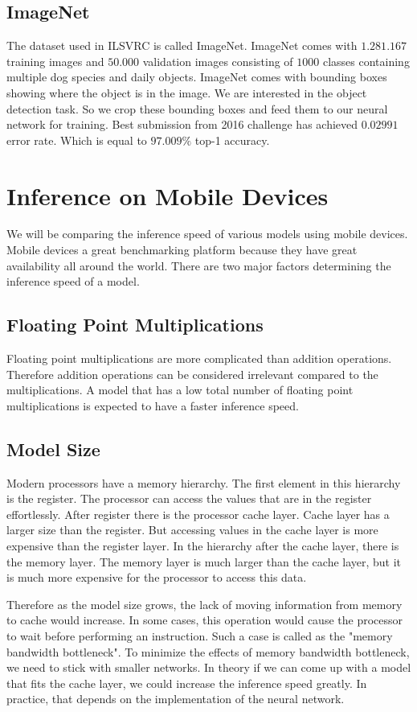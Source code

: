 \subsection{ImageNet}
The dataset used in ILSVRC is called ImageNet. ImageNet \cite{deng2012image} comes with $1.281.167$ training images and $50.000$ validation images consisting of $1000$ classes containing multiple dog species and daily objects. ImageNet comes with bounding boxes showing where the object is in the image. We are interested in the object detection task. So we crop these bounding boxes and feed them to our neural network for training. Best submission from 2016 challenge has achieved $0.02991$ error rate. Which is equal to $97.009\%$ top-1 accuracy. 
\iffalse
\section{Inference on Mobile Devices}
We will be comparing the inference speed of various models using mobile devices. Mobile devices a great benchmarking platform because they have great availability all around the world. There are two major factors determining the inference speed of a model.

\subsection{Floating Point Multiplications}
Floating point multiplications are more complicated than addition operations. Therefore addition operations can be considered irrelevant compared to the multiplications. A model that has a low total number of floating point multiplications is expected to have a faster inference speed.

\subsection{Model Size}
Modern processors have a memory hierarchy. The first element in this hierarchy is the register. The processor can access the values that are in the register effortlessly. After register there is the processor cache layer. Cache layer has a larger size than the register. But accessing values in the cache layer is more expensive than the register layer. In the hierarchy after the cache layer, there is the memory layer. The memory layer is much larger than the cache layer, but it is much more expensive for the processor to access this data. 

Therefore as the model size grows, the lack of moving information from memory to cache would increase. In some cases, this operation would cause the processor to wait before performing an instruction. Such a case is called as the "memory bandwidth bottleneck". To minimize the effects of memory bandwidth bottleneck, we need to stick with smaller networks. In theory if we can come up with a model that fits the cache layer, we could increase the inference speed greatly. In practice, that depends on the implementation of the neural network.


